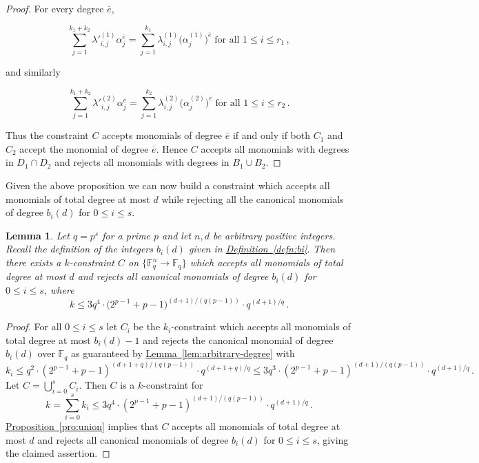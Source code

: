 \documentclass[10pt]{article}
\newtheorem{lemma}[theorem]{Lemma}
\theoremstyle{definition}
\numberwithin{equation}{section}
\newcommand{\expref}[2]{\texorpdfstring{\hyperref[#2]{#1~\ref{#2}}}{#1~\ref{#2}}}
\newcommand{\F}{{\mathbb{F}}}
\begin{document}
\begin{proof}
For every degree $\overline e$,

\[\sum_{j=1}^{k_1+k_2} \lambda'^{(1)}_{i,j} \alpha_j^{\overline e} =  \sum_{j=1}^{k_1} \lambda^{(1)}_{i,j} \big(\alpha^{(1)}_j\big)^{\overline e} \; \text{for all $1 \leq i \leq r_1$}\,, \]

and similarly

\[\sum_{j=1}^{k_1+k_2} \lambda'^{(2)}_{i,j} \alpha_j^{\overline e} =  \sum_{j=1}^{k_2} \lambda^{(2)}_{i,j} \big(\alpha^{(2)}_j\big)^{\overline e} \; \text{for all $1 \leq i \leq r_2$}\,.\]

Thus the constraint $C$ accepts monomials of degree $\overline e$ if and only if both $C_1$ and $C_2$ accept the monomial of degree $\overline e$.
Hence $C$ accepts all monomials with degrees in $D_1 \cap D_2$ and rejects
all monomials with degrees in $B_1 \cup B_2$.
\end{proof}



Given the above proposition we can now build a constraint which
accepts all monomials of total degree at most $d$ while rejecting
all the canonical monomials of degree $b_i(d)$ for $0 \leq i \leq s$.

\begin{lemma}
\label{lem:canonical-monomial-single-orbit}
Let $q=p^s$ for a prime $p$ and let $n, d$ be arbitrary positive integers. Recall the definition of the integers $b_i(d)$ given in \expref{Definition}{defn:bi}.
Then there exists a $k$-constraint $C$ on $\{\F_q^n \to \F_q\}$
which accepts all monomials
of total degree at most $d$ and rejects all canonical
monomials of degree $b_i(d)$ for $0 \leq i \leq s$, where
\[k \leq 3q^4 \cdot \big(2^{p-1}+p-1\big)^{(d+1)/(q(p-1))} \cdot q^{(d+1)/q}\,.\]
\end{lemma}


\begin{proof}
For all $0 \leq i \leq s$ let $C_i$ be the $k_i$-constraint which accepts all monomials of total degree at most $b_i(d)-1$
and
rejects the canonical monomial of degree $b_i(d)$ over $\F_q$ as guaranteed by \expref{Lemma}{lem:arbitrary-degree}
with $$k_i \leq q^2  \cdot (2^{p-1}+p-1)^{(d+1+q)/(q(p-1))} \cdot q^{(d+1+q)/q} \leq 3q^3 \cdot (2^{p-1}+p-1)^{(d+1)/(q(p-1))} \cdot q^{(d+1)/q}\,.$$
Let $C = \bigcup_{i=0}^{s}C_i$. Then $C$ is a $k$-constraint for $$k = \sum_{i=0}^{s} k_i \leq 3q^4 \cdot (2^{p-1}+p-1)^{(d+1)/(q(p-1))} \cdot q^{(d+1)/q}\,.$$
\expref{Proposition}{pro:union} implies that $C$ accepts all monomials of total degree at most $d$ and rejects all canonical monomials
of degree $b_i(d)$ for $0 \leq i \leq s$, giving the claimed assertion.
\end{proof}
\end{document}
